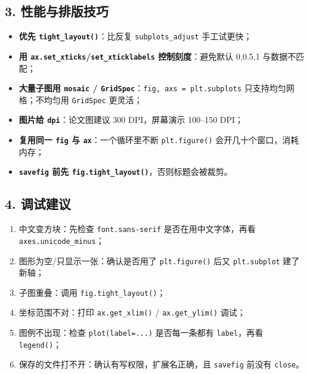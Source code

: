 \subsection{3.
性能与排版技巧}\label{ux6027ux80fdux4e0eux6392ux7248ux6280ux5de7}

\begin{itemize}
\tightlist
\item
  \textbf{优先 \texttt{tight\_layout()}}：比反复
  \texttt{subplots\_adjust} 手工试更快；
\item
  \textbf{用 \texttt{ax.set\_xticks}/\texttt{set\_xticklabels}
  控制刻度}：避免默认 0,0.5,1 与数据不匹配；
\item
  \textbf{大量子图用 \texttt{mosaic} /
  \texttt{GridSpec}}：\texttt{fig,\ axs\ =\ plt.subplots}
  只支持均匀网格；不均匀用 \texttt{GridSpec} 更灵活；
\item
  \textbf{图片给 \texttt{dpi}}：论文图建议 300 DPI，屏幕演示 100--150
  DPI；
\item
  \textbf{复用同一 \texttt{fig} 与 \texttt{ax}}：一个循环里不断
  \texttt{plt.figure()} 会开几十个窗口，消耗内存；
\item
  \textbf{\texttt{savefig} 前先
  \texttt{fig.tight\_layout()}}，否则标题会被裁剪。
\end{itemize}

\subsection{4. 调试建议}\label{ux8c03ux8bd5ux5efaux8bae-4}

\begin{enumerate}
\def\labelenumi{\arabic{enumi}.}
\tightlist
\item
  中文变方块：先检查 \texttt{font.sans-serif} 是否在用中文字体，再看
  \texttt{axes.unicode\_minus}；
\item
  图形为空/只显示一张：确认是否用了 \texttt{plt.figure()} 后又
  \texttt{plt.subplot} 建了新轴；
\item
  子图重叠：调用 \texttt{fig.tight\_layout()}；
\item
  坐标范围不对：打印 \texttt{ax.get\_xlim()} / \texttt{ax.get\_ylim()}
  调试；
\item
  图例不出现：检查 \texttt{plot(label=...)} 是否每一条都有
  \texttt{label}，再看 \texttt{legend()}；
\item
  保存的文件打不开：确认有写权限，扩展名正确，且 \texttt{savefig} 前没有
  \texttt{close}。
\end{enumerate}

